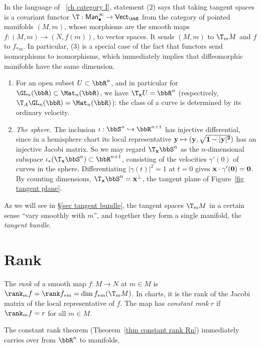 In the language of \Chap~\ref{ch category I}, statement (2) says that taking tangent spaces is a covariant functor $\T:\mathsf{Man}^\infty_\bullet\to\mathsf{Vect}_\bbR$ from the category of pointed manifolds $(M,m)$, whose morphisms are the smooth maps $f:(M,m)\to(N,f(m))$, to vector spaces. It sends $(M,m)$ to $\T_mM$ and $f$ to $f_{\ast m}$. In particular, (3) is a special case of the fact that functors send isomorphisms to isomorphisms, which immediately implies that diffeomorphic manifolds have the same dimension.

\begin{example}\label{example tangent spaces}
    \begin{enumerate}
        \item For an open subset $U\subset\bbR^n$, and in particular for $\GL_n(\bbR)\subset\Mat_n(\bbR)$, we have $\T_{\bf{x}}U=\bbR^n$ (respectively, $\T_A\GL_n(\bbR)=\Mat_n(\bbR)$): the class of a curve is determined by its ordinary velocity.
        \item \emph{The sphere.} The inclusion $\iota:\bbS^n\hookrightarrow\bbR^{n+1}$ has injective differential, since in a hemisphere chart its local representative $\bf{y}\mapsto(\bf{y},\sqrt{1-\lvert\bf{y}\rvert^2})$ has an injective Jacobi matrix. So we may regard $\T_{\bf{x}}\bbS^n$ as the $n$-dimensional subspace $\iota_\ast(\T_{\bf{x}}\bbS^n)\subset\bbR^{n+1}$, consisting of the velocities $\gamma'(0)$ of curves in the sphere. Differentiating $\lvert\gamma(t)\rvert^2=1$ at $t=0$ gives $\bf{x}\cdot\gamma'(0)=0$. By counting dimensions, $\T_{\bf{x}}\bbS^n=\bf{x}^\perp$, the tangent plane of Figure~\ref{fig tangent plane}.
    \end{enumerate}
\end{example}

As we will see in \S\ref{sec tangent bundle}, the tangent spaces $\T_mM$ in a certain sense ``vary smoothly with $m$'', and together they form a single manifold, the \emph{tangent bundle}.


\section{Rank}\label{sec rank}

\begin{defn}\label{def.rank}
    The \emph{rank} of a smooth map $f:M\to N$ at $m\in M$ is $\rank_mf=\rank f_{\ast m}=\dim f_{\ast m}(\T_mM)$. In charts, it is the rank of the Jacobi matrix of the local representative of $f$. The map has \emph{constant rank} $r$ if $\rank_mf=r$ for all $m\in M$.
\end{defn}
The constant rank theorem (Theorem~\ref{thm constant rank Rn}) immediately carries over from $\bbR^n$ to manifolds.

